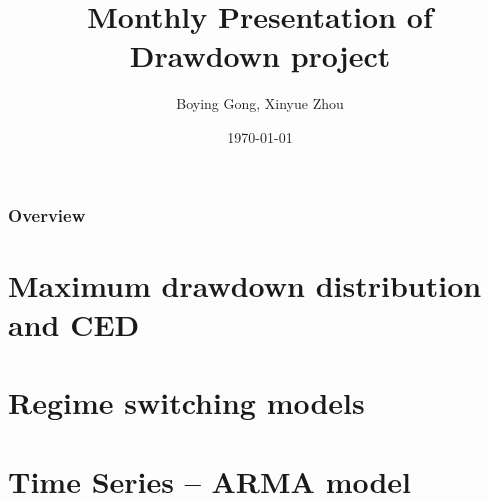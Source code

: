 \documentclass{beamer}
\title[Drawdown project]{Monthly Presentation of Drawdown project} %
\author{Boying Gong, Xinyue Zhou} %
\institute[UC Berkeley] %
{
University of California, Berkeley \\ %
\medskip
\textit{jorothy\_gong@berkeley.edu \\}
\textit{xinyue233@berkeley.edu} %
}
\date{\today} %
\begin{document}
\begin{frame}
\titlepage %
\end{frame}

\begin{frame}
\frametitle{Overview} %
\tableofcontents %
\end{frame}


\section{Maximum drawdown distribution and CED}

\section{Regime switching models}

\section{Time Series – ARMA model}
\end{document}
